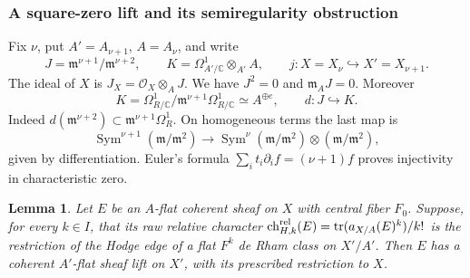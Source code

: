 \documentclass[11pt]{article}
\newcommand{\C}{\mathbb C}
\newtheorem{lemma}[theorem]{Lemma}
\numberwithin{equation}{section}
\begin{document}
\subsubsection{A square-zero lift and its semiregularity obstruction}

Fix \(\nu\), put \(A'=A_{\nu+1}\), \(A=A_\nu\), and write
\[
 J=\mathfrak m^{\nu+1}/\mathfrak m^{\nu+2},\qquad
 K=\Omega^1_{A'/\C}\otimes_{A'}A,\qquad
 j:X=X_\nu\hookrightarrow X'=X_{\nu+1}.
\]
The ideal of \(X\) is \(J_X=\mathcal O_X\otimes_AJ\).
We have \(J^2=0\) and \(\mathfrak m_AJ=0\).  Moreover
\begin{equation}
\label{p3sw:bf-jacobi}
 K=\Omega^1_{R/\C}/\mathfrak m^{\nu+1}\Omega^1_{R/\C}
       \simeq A^{\oplus e},\qquad d:J\hookrightarrow K.
\end{equation}
Indeed \(d(\mathfrak m^{\nu+2})\subset
\mathfrak m^{\nu+1}\Omega_R^1\).  On homogeneous terms the last
map is
\[
 \operatorname{Sym}^{\nu+1}(\mathfrak m/\mathfrak m^2)
 \longrightarrow
 \operatorname{Sym}^{\nu}(\mathfrak m/\mathfrak m^2)
          \otimes(\mathfrak m/\mathfrak m^2),
\]
given by differentiation.  Euler's formula
\(\sum_i t_i\partial_i f=(\nu+1)f\) proves injectivity in
characteristic zero.

\begin{lemma}
\label{p3sw:bf-one-step}
Let \(E\) be an \(A\)-flat coherent sheaf on \(X\) with central
fiber \(F_0\).  Suppose, for every \(k\in I\), that its raw relative
character
\(\operatorname{ch}^{\rm rel}_{H,k}(E)
=\operatorname{tr}(a_{X/A}(E)^k)/k!\)
is the restriction of the Hodge edge of a flat \(F^k\) de Rham
class on \(X'/A'\).  Then \(E\) has a coherent \(A'\)-flat
sheaf lift on \(X'\), with its prescribed restriction to \(X\).
\end{lemma}
\end{document}
